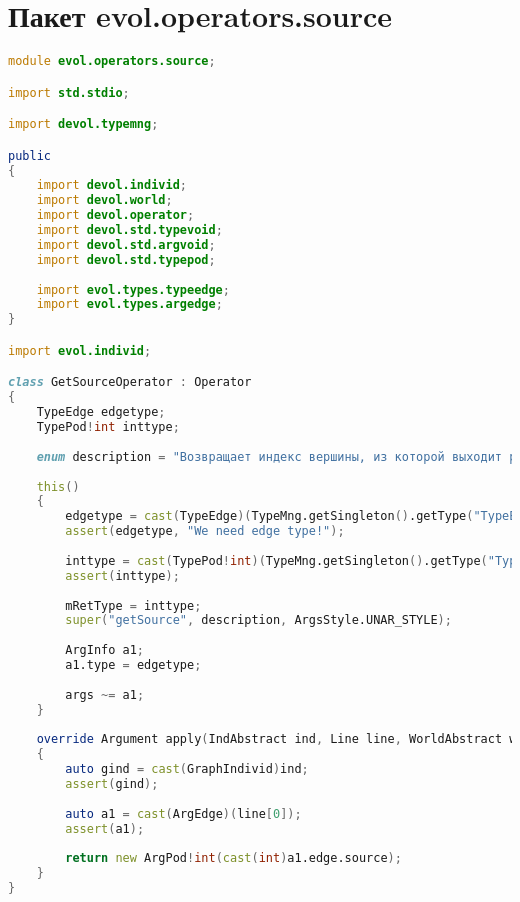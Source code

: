 \documentclass[russian,utf8,emptystyle]{eskdtext}
\begin{document}
\section{Пакет evol.operators.source}
\begin{lstlisting}[language=D]
module evol.operators.source;

import std.stdio;

import devol.typemng;

public
{
    import devol.individ;
    import devol.world;
    import devol.operator;
    import devol.std.typevoid;
    import devol.std.argvoid;
    import devol.std.typepod;
    
    import evol.types.typeedge;
    import evol.types.argedge;
}

import evol.individ;

class GetSourceOperator : Operator
{
    TypeEdge edgetype;
    TypePod!int inttype;
    
    enum description = "Возвращает индекс вершины, из которой выходит ребро графа.";
    
    this()
    {
        edgetype = cast(TypeEdge)(TypeMng.getSingleton().getType("TypeEdge"));
        assert(edgetype, "We need edge type!");
    
        inttype = cast(TypePod!int)(TypeMng.getSingleton().getType("Typeint"));
        assert(inttype);
        
        mRetType = inttype;
        super("getSource", description, ArgsStyle.UNAR_STYLE);
        
        ArgInfo a1;
        a1.type = edgetype;
        
        args ~= a1;
    }
    
    override Argument apply(IndAbstract ind, Line line, WorldAbstract world)
    {
        auto gind = cast(GraphIndivid)ind;
        assert(gind);
        
        auto a1 = cast(ArgEdge)(line[0]);
        assert(a1);
        
        return new ArgPod!int(cast(int)a1.edge.source);
    }   
}
\end{lstlisting}
\end{document}
